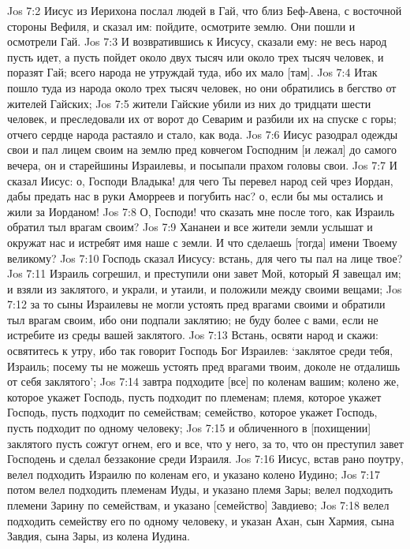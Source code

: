 Jos 7:2  Иисус из Иерихона послал людей в Гай, что близ Беф-Авена, с восточной стороны Вефиля, и сказал им: пойдите, осмотрите землю. Они пошли и осмотрели Гай.
Jos 7:3  И возвратившись к Иисусу, сказали ему: не весь народ пусть идет, а пусть пойдет около двух тысяч или около трех тысяч человек, и поразят Гай; всего народа не утруждай туда, ибо их мало [там].
Jos 7:4  Итак пошло туда из народа около трех тысяч человек, но они обратились в бегство от жителей Гайских;
Jos 7:5  жители Гайские убили из них до тридцати шести человек, и преследовали их от ворот до Севарим и разбили их на спуске с горы; отчего сердце народа растаяло и стало, как вода.
Jos 7:6  Иисус разодрал одежды свои и пал лицем своим на землю пред ковчегом Господним [и лежал] до самого вечера, он и старейшины Израилевы, и посыпали прахом головы свои.
Jos 7:7  И сказал Иисус: о, Господи Владыка! для чего Ты перевел народ сей чрез Иордан, дабы предать нас в руки Аморреев и погубить нас? о, если бы мы остались и жили за Иорданом!
Jos 7:8  О, Господи! что сказать мне после того, как Израиль обратил тыл врагам своим?
Jos 7:9  Хананеи и все жители земли услышат и окружат нас и истребят имя наше с земли. И что сделаешь [тогда] имени Твоему великому?
Jos 7:10  Господь сказал Иисусу: встань, для чего ты пал на лице твое?
Jos 7:11  Израиль согрешил, и преступили они завет Мой, который Я завещал им; и взяли из заклятого, и украли, и утаили, и положили между своими вещами;
Jos 7:12  за то сыны Израилевы не могли устоять пред врагами своими и обратили тыл врагам своим, ибо они подпали заклятию; не буду более с вами, если не истребите из среды вашей заклятого.
Jos 7:13  Встань, освяти народ и скажи: освятитесь к утру, ибо так говорит Господь Бог Израилев: `заклятое среди тебя, Израиль; посему ты не можешь устоять пред врагами твоим, доколе не отдалишь от себя заклятого';
Jos 7:14  завтра подходите [все] по коленам вашим; колено же, которое укажет Господь, пусть подходит по племенам; племя, которое укажет Господь, пусть подходит по семействам; семейство, которое укажет Господь, пусть подходит по одному человеку;
Jos 7:15  и обличенного в [похищении] заклятого пусть сожгут огнем, его и все, что у него, за то, что он преступил завет Господень и сделал беззаконие среди Израиля.
Jos 7:16  Иисус, встав рано поутру, велел подходить Израилю по коленам его, и указано колено Иудино;
Jos 7:17  потом велел подходить племенам Иуды, и указано племя Зары; велел подходить племени Зарину по семействам, и указано [семейство] Завдиево;
Jos 7:18  велел подходить семейству его по одному человеку, и указан Ахан, сын Хармия, сына Завдия, сына Зары, из колена Иудина.

